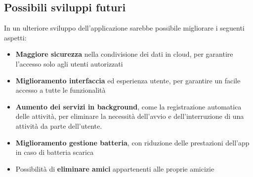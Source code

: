 \documentclass{article}
\begin{document}
    \subsection*{Possibili sviluppi futuri}
    In un ulteriore sviluppo dell'applicazione sarebbe possibile migliorare i seguenti aspetti:
    \begin{itemize}
        \renewcommand{\labelitemi}{-}
        \item \textbf{Maggiore sicurezza} nella condivisione dei dati in cloud, per garantire l'accesso solo agli utenti autorizzati
        \item \textbf{Miglioramento interfaccia} ed esperienza utente, per garantire un facile accesso a tutte le funzionalità
        \item \textbf{Aumento dei servizi in background}, come la registrazione automatica delle attività, per eliminare la necessità dell'avvio e dell'interruzione di una attività da parte dell'utente.
        \item \textbf{Miglioramento gestione batteria}, con riduzione delle prestazioni dell'app in caso di batteria scarica
        \item Possibilità di \textbf{eliminare amici} appartenenti alle proprie amicizie
    \end{itemize}
\end{document}
